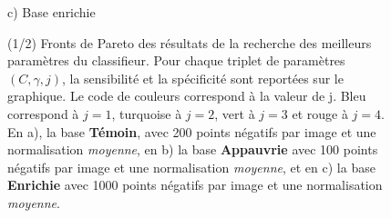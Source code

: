 \begin{figure}[h!]
\begin{center}
{\small c) Base enrichie}

\end{center}
 \caption[(1/2) Recherche des meilleurs paramètres du classifieurs : Fronts de pareto]{(1/2) Fronts de Pareto des résultats de la recherche des meilleurs paramètres du classifieur. Pour chaque triplet de paramètres $(C, \gamma, j)$, la sensibilité et la spécificité sont reportées sur le graphique. Le code de couleurs correspond à la valeur de j. Bleu correspond à $j=1$, turquoise à $j=2$, vert à $j=3$ et rouge à $j=4$. En a), la base \textbf{Témoin}, avec 200 points négatifs par image et une normalisation \emph{moyenne}, en b) la base \textbf{Appauvrie} avec 100 points négatifs par image et une normalisation \emph{moyenne}, et en c) la base \textbf{Enrichie} avec 1000 points négatifs par image et une normalisation \emph{moyenne}.}
\label{fig:paretoParams1}
\end{figure}



